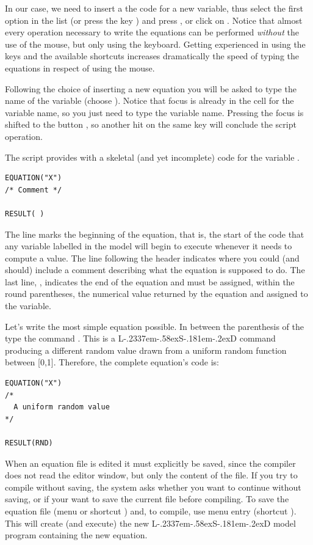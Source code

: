 \documentclass [11pt,a4paper] {book}
\def\LsD{{L\kern-.2337em\lower-.58ex\hbox{S}\kern-.181em\lower-.2ex\hbox{D}}\xspace}
\begin{document}
In our case, we need to insert a the code for a new variable, thus select the first option in the list (or press the key ) and press , or click on . Notice that almost every operation necessary to write the equations can be performed \textit{without} the use of the mouse, but only using the keyboard. Getting experienced in using the keys and the available shortcuts increases dramatically the speed of typing the equations in respect of using the mouse. 
 
Following the choice of inserting a new equation you will be asked to type the name of the variable (choose ). Notice that focus is already in the cell for the variable name, so you just need to type the variable name. Pressing  the focus is shifted to the button , so another hit on the same key will conclude the script operation.

The script provides with a skeletal (and yet incomplete) code for the variable . 

\small
\begin{verbatim}
EQUATION("X")
/* Comment */

RESULT( )
\end{verbatim}
\normalsize

The line  marks the beginning of the equation, that is, the start of the code that any variable labelled  in the model will begin to execute whenever it needs to compute a value. The line following the header  indicates where you could (and should) include a comment describing what the equation is supposed to do. The last line, , indicates the end of the equation and must be assigned, within the round parentheses, the numerical value returned by the equation and assigned to the variable.

Let's write the most simple equation possible. In between the parenthesis of the
 type the command . This is a \LsD command producing a different
random value drawn from a uniform random function between [0,1]. Therefore, the complete
equation's code is:

\small
\begin{verbatim}
EQUATION("X")
/*
  A uniform random value
*/

RESULT(RND)
\end{verbatim}
\normalsize

When an equation file is edited it must explicitly be saved, since the compiler does not read the editor window, but only the content of the file. If you try to compile without saving, the system asks whether you want to continue without saving, or if your want to save the current file before compiling. To save the equation file (menu  or shortcut ) and, to compile,  use menu entry  (shortcut 
). This will create (and execute) the new \LsD model program containing the new equation.
\end{document}
